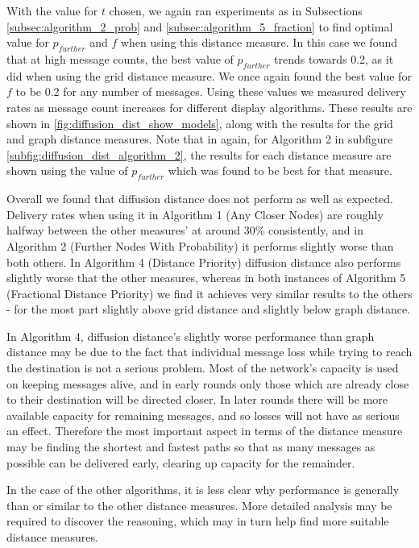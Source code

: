 \documentclass[bsc,frontabs,twoside,singlespacing,parskip,deptreport]{infthesis}     %
\begin{document}
With the value for $t$ chosen, we again ran experiments as in Subsections \ref{subsec:algorithm_2_prob} and \ref{subsec:algorithm_5_fraction} to find optimal value for $p_{further}$ and $f$ when using this distance measure. In this case we found that at high message counts, the best value of $p_{further}$ trends towards 0.2, as it did when using the grid distance measure. We once again found the best value for $f$ to be 0.2 for any number of messages. Using these values we measured delivery rates as message count increases for different display algorithms. These results are shown in \ref{fig:diffusion_dist_show_models}, along with the results for the grid and graph distance measures. Note that in again, for Algorithm 2 in subfigure \ref{subfig:diffusion_dist_algorithm_2}, the results for each distance measure are shown using the value of $p_{further}$ which was found to be best for that measure.

Overall we found that diffusion distance does not perform as well as expected. Delivery rates when using it in Algorithm 1 (Any Closer Nodes) are roughly halfway between the other measures' at around 30\% consistently, and in Algorithm 2 (Further Nodes With Probability) it performs slightly worse than both others. In Algorithm 4 (Distance Priority) diffusion distance also performs slightly worse that the other measures, whereas in both instances of Algorithm 5 (Fractional Distance Priority) we find it achieves very similar results to the others - for the most part slightly above grid distance and slightly below graph distance.

In Algorithm 4, diffusion distance's slightly worse performance than graph distance may be due to the fact that individual message loss while trying to reach the destination is not a serious problem. Most of the network's capacity is used on keeping messages alive, and in early rounds only those which are already close to their destination will be directed closer. In later rounds there will be more available capacity for remaining messages, and so losses will not have as serious an effect. Therefore the most important aspect in terms of the distance measure may be finding the shortest and fastest paths so that as many messages as possible can be delivered early, clearing up capacity for the remainder.

In the case of the other algorithms, it is less clear why performance is generally than or similar to the other distance measures. More detailed analysis may be required to discover the reasoning, which may in turn help find more suitable distance measures.
\end{document}
